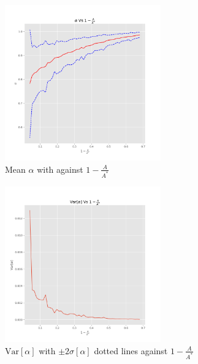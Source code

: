 \documentclass{article}
\begin{document}
\begin{figure}[h!]
\centering

\includegraphics[width=0.6\textwidth]{alphaDependence.png}
\caption{Mean $\alpha$ with against $1 - \frac{A}{A^{*}}$}
\label{fig5}
\end{figure}

\begin{figure}[h!]
\centering

\includegraphics[width=0.6\textwidth]{alphaDependenceVar.png}
\caption{$\mathrm{Var}[\alpha]$ with $\pm2\sigma[\alpha]$ dotted lines against $1 - \frac{A}{A^{*}}$}
\label{fig6}
\end{figure}








\end{document}
